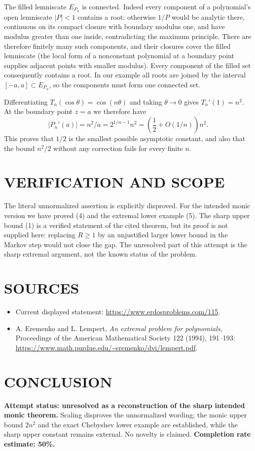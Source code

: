 The filled lemniscate $E_{P_n}$ is connected. Indeed every component of a polynomial's open lemniscate $|P|<1$ contains a root: otherwise $1/P$ would be analytic there, continuous on its compact closure with boundary modulus one, and have modulus greater than one inside, contradicting the maximum principle. There are therefore finitely many such components, and their closures cover the filled lemniscate (the local form of a nonconstant polynomial at a boundary point supplies adjacent points with smaller modulus). Every component of the filled set consequently contains a root. In our example all roots are joined by the interval $[-a,a]\subset E_{P_n}$, so the components must form one connected set.

Differentiating $T_n(\cos\theta)=\cos(n\theta)$ and taking $\theta\to0$ gives $T_n'(1)=n^2$. At the boundary point $z=a$ we therefore have
\[
|P_n'(a)|=n^2/a=2^{1/n-1}n^2
=\left(\frac12+O(1/n)\right)n^2.
\tag{5}
\]
This proves that $1/2$ is the smallest possible asymptotic constant, and also that the bound $n^2/2$ without any correction fails for every finite $n$.

\section{VERIFICATION AND SCOPE}
The literal unnormalized assertion is explicitly disproved. For the intended monic version we have proved (4) and the extremal lower example (5). The sharp upper bound (1) is a verified statement of the cited theorem, but its proof is not supplied here: replacing $R\geq1$ by an unjustified larger lower bound in the Markov step would not close the gap. The unresolved part of this attempt is the sharp extremal argument, not the known status of the problem.

\section{SOURCES}
\begin{itemize}
\item Current displayed statement: \url{https://www.erdosproblems.com/115}.
\item A. Eremenko and L. Lempert, \emph{An extremal problem for polynomials}, Proceedings of the American Mathematical Society 122 (1994), 191--193: \url{https://www.math.purdue.edu/~eremenko/dvi/lempert.pdf}.
\end{itemize}

\section{CONCLUSION}
\textbf{Attempt status: unresolved as a reconstruction of the sharp intended monic theorem.} Scaling disproves the unnormalized wording; the monic upper bound $2n^2$ and the exact Chebyshev lower example are established, while the sharp upper constant remains external. No novelty is claimed.
\textbf{Completion rate estimate: 50\%.}
